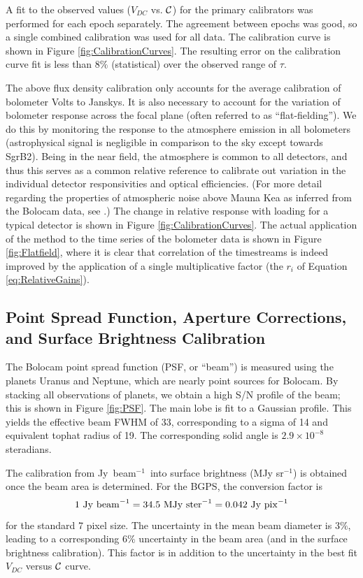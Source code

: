 \documentclass[12pt,preprint]{aastex}
\newcommand\jyb{Jy~beam$^{-1}$}
\newcommand{\bcamfwhmeff}{33\arcsec}
\begin{document}
A fit to the observed values ($V_{DC}$ vs. ${\cal C}$) for the primary
calibrators was performed for each epoch separately.  The
agreement between epochs was good, so a single combined calibration
was used for all data.  The calibration curve is shown in Figure
\ref{fig:CalibrationCurves}.  The resulting error on the calibration
curve fit is less than $8\%$ (statistical) over the observed range of
$\tau$.  

The above flux density calibration only accounts for the average
calibration of bolometer Volts to Janskys.  It is also necessary to
account for the variation of bolometer response across the focal plane
(often referred to as ``flat-fielding'').  We do this by monitoring
the response to the atmosphere emission in all bolometers
(astrophysical signal is negligible in comparison to the sky except
towards SgrB2).  Being in the near field, the atmosphere is common to
all detectors, and thus this serves as a common relative reference to
calibrate out variation in the individual detector responsivities and
optical efficiencies.  (For more detail regarding the properties of
atmospheric noise above Mauna Kea as inferred from the Bolocam data,
see \citet{sayers10}.)  The change in relative response with loading
for a typical detector is shown in Figure \ref{fig:CalibrationCurves}.
The actual application of the method to the time series of the
bolometer data is shown in Figure \ref{fig:Flatfield}, where it is
clear that correlation of the timestreams is indeed improved by the
application of a single multiplicative factor (the $r_i$ of Equation
\ref{eq:RelativeGains}).

\subsection{Point Spread Function, Aperture Corrections,
and Surface Brightness Calibration}

The Bolocam point spread function (PSF, or ``beam'') is measured using
the planets Uranus and Neptune, which are nearly point sources for
Bolocam.  By stacking all observations of planets, we obtain a high
S/N profile of the beam; this is shown in Figure \ref{fig:PSF}.  The
main lobe is fit to a Gaussian profile.  This yields the effective
beam FWHM of \bcamfwhmeff, corresponding to a sigma of 14 and
equivalent tophat radius of 19.  The corresponding solid angle
is $2.9\times10^{-8}$ steradians.

The calibration from \jyb\ into surface brightness (MJy sr$^{-1}$) is
obtained once the beam area is determined.  For the BGPS, the
conversion factor is
\begin{equation}
1 ~\rm{Jy~beam}^{-1} = 34.5~\rm{MJy~ster}^{-1} = 0.042~{\rm Jy~pix}^{-1}
\end{equation}
for the standard 7 pixel size.  The uncertainty in the mean
beam diameter is $3\%$, leading to a corresponding $6\%$ uncertainty
in the beam area (and in the surface brightness calibration).  This
factor is in addition to the uncertainty in the best fit $V_{DC}$
versus ${\cal C}$ curve.
\end{document}
